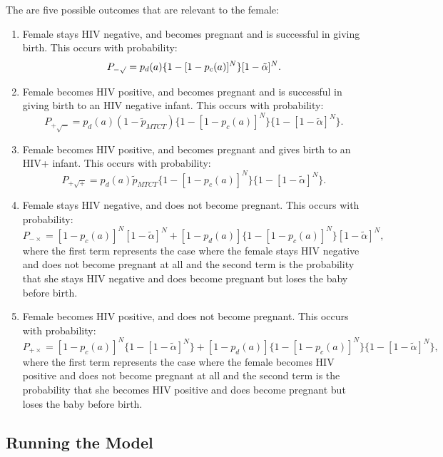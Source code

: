 \documentclass[11pt]{nih_mod}
\begin{document}
The are five possible outcomes that are relevant to the female:
\begin{enumerate}
\item  Female stays HIV negative, and becomes pregnant and is successful in giving birth. This occurs with probability:
\begin{equation}
	P_{-\surd} = p_d(a)\{1-[1-p_c(a)]^N\}[1-\tilde{\alpha}]^N.
\end{equation}

\item  Female becomes HIV positive, and becomes pregnant and is successful in giving birth to an HIV negative infant. This occurs with probability:
\begin{equation}
	P_{+\surd - } = p_d(a)(1-\tilde{p}_{MTCT}) \{1-[1-p_c(a)]^N\}\{1-[1-\tilde{\alpha}]^N\}.
\end{equation}

\item  Female becomes HIV positive, and becomes pregnant and gives birth to an HIV+ infant. This occurs with probability:
\begin{equation}
	P_{+\surd +} = p_d(a)\tilde{p}_{MTCT} \{1-[1-p_c(a)]^N\}\{1-[1-\tilde{\alpha}]^N\}.
\end{equation}
\item  Female stays HIV negative, and does not become pregnant. This occurs with probability:
\begin{equation}
	P_{-\times} =  [1-p_c(a)]^N [1-\tilde{\alpha}]^N+[1-p_d(a)]\{1-[1-p_c(a)]^N\}[1-\tilde{\alpha}]^N,
\end{equation}
where the first term represents the case where the female stays HIV negative and does not become pregnant at all and the second term is the probability that she stays HIV negative and does become pregnant but loses the baby before birth. 
\item  Female becomes HIV positive, and does not become pregnant. This occurs with probability:
\begin{equation}
	P_{+\times} =  [1-p_c(a)]^N \{1-[1-\tilde{\alpha}]^N\}+[1-p_d(a)]\{1-[1-p_c(a)]^N\}\{1-[1-\tilde{\alpha}]^N\},
\end{equation}
where the first term represents the case where the female becomes HIV positive and does not become pregnant at all and the second term is the probability that she becomes HIV positive and does become pregnant but loses the baby before birth. 
\end{enumerate}

\subsection{Running the Model}
\end{document}
